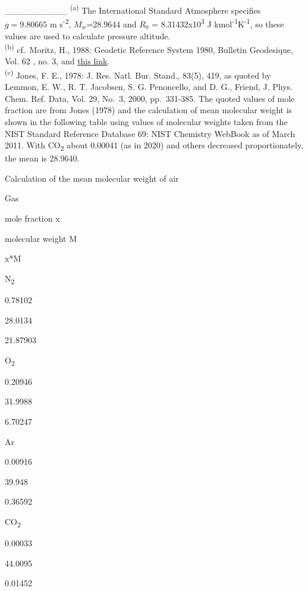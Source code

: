 \documentclass[
  english,
]{book}
\begin{document}
\_\_\_\_\_\_\_\_\_\_
\textsuperscript{(a)} The International Standard Atmosphere specifies \(g=9.80665\) m s\textsuperscript{-2},
\(M_{w}\)=28.9644 and \(R_{0}\) = 8.31432x10\textsuperscript{3} J kmol\textsuperscript{-1}K\textsuperscript{-1},
so these values are used to calculate pressure altitude.\\
\textsuperscript{(b)} cf.~Moritz, H., 1988: Geodetic Reference System 1980, Bulletin Geodesique,
Vol. 62 , no. 3, and \href{https://earth-info.nga.mil/php/download.php?file=coord-wgs84}{this link}.\\
\textsuperscript{(c)} Jones, F. E., 1978: J. Res. Natl. Bur. Stand., 83(5), 419, as quoted
by Lemmon, E. W., R. T. Jacobsen, S. G. Penoncello, and D. G., Friend,
J. Phys. Chem. Ref. Data, Vol. 29, No.~3, 2000, pp.~331-385. The quoted
values of mole fraction are from Jones (1978) and the calculation of mean
molecular weight is shown in the following table
using values of molecular weights
taken from the NIST Standard Reference Database 69: NIST Chemistry
WebBook as of March 2011. With CO\textsubscript{2} about 0.00041 (as in 2020) and others
decreased proportionately, the mean is 28.9640.

\label{tab:unnamed-chunk-6}Calculation of the mean molecular weight of air

Gas

mole fraction x

molecular weight M

x*M

N\textsubscript{2}

0.78102

28.0134

21.87903

O\textsubscript{2}

0.20946

31.9988

6.70247

Ar

0.00916

39.948

0.36592

CO\textsubscript{2}

0.00033

44.0095

0.01452
\end{document}
